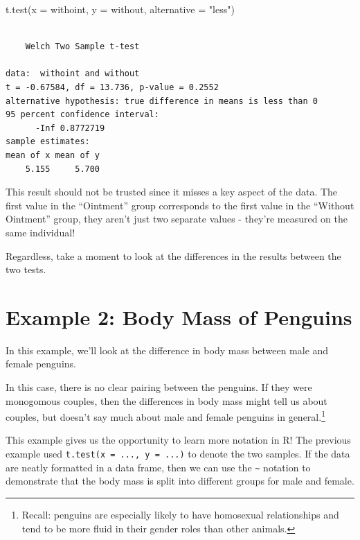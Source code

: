 \documentclass[
  letterpaper,
  DIV=11,
  numbers=noendperiod,
  oneside]{scrreprt}
\newenvironment{Shaded}{\begin{snugshade}}{\end{snugshade}}
\newcommand{\AttributeTok}[1]{\textcolor[rgb]{0.40,0.45,0.13}{#1}}
\newcommand{\FunctionTok}[1]{\textcolor[rgb]{0.28,0.35,0.67}{#1}}
\newcommand{\NormalTok}[1]{\textcolor[rgb]{0.00,0.23,0.31}{#1}}
\newcommand{\StringTok}[1]{\textcolor[rgb]{0.13,0.47,0.30}{#1}}
\begin{document}
\begin{Shaded}
\begin{Highlighting}[]
\FunctionTok{t.test}\NormalTok{(}\AttributeTok{x =}\NormalTok{ withoint, }\AttributeTok{y =}\NormalTok{ without, }\AttributeTok{alternative =} \StringTok{"less"}\NormalTok{)}
\end{Highlighting}
\end{Shaded}

\begin{verbatim}

    Welch Two Sample t-test

data:  withoint and without
t = -0.67584, df = 13.736, p-value = 0.2552
alternative hypothesis: true difference in means is less than 0
95 percent confidence interval:
      -Inf 0.8772719
sample estimates:
mean of x mean of y 
    5.155     5.700 
\end{verbatim}

This result should not be trusted since it misses a key aspect of the
data. The first value in the ``Ointment'' group corresponds to the first
value in the ``Without Ointment'' group, they aren't just two separate
values - they're measured on the same individual!

Regardless, take a moment to look at the differences in the results
between the two tests.

\hypertarget{example-2-body-mass-of-penguins}{%
\section{Example 2: Body Mass of
Penguins}\label{example-2-body-mass-of-penguins}}

In this example, we'll look at the difference in body mass between male
and female penguins.

In this case, there is no clear pairing between the penguins. If they
were monogomous couples, then the differences in body mass might tell us
about couples, but doesn't say much about male and female penguins in
general.\footnote{Recall: penguins are especially likely to have
  homosexual relationships and tend to be more fluid in their gender
  roles than other animals.}

This example gives us the opportunity to learn more notation in R! The
previous example used \texttt{t.test(x\ =\ ...,\ y\ =\ ...)} to denote
the two samples. If the data are neatly formatted in a data frame, then
we can use the \texttt{\textasciitilde{}} notation to demonstrate that
the body mass is split into different groups for male and female.
\end{document}
